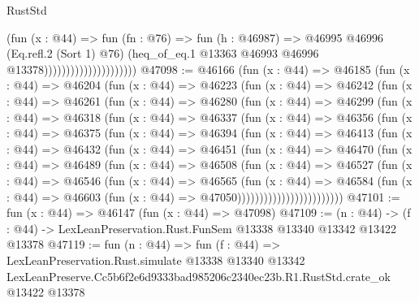 \begin{lexlean}{RustStd}
\begin{coremodule}
                                          (fun (x : @44) =>
                                          fun (fn : @76) =>
                                          fun (h : @46987) =>
                                          @46995
                                            @46996
                                            (Eq.refl.{2} (Sort 1) @76)
                                            (heq_of_eq.{1}
                                              @13363
                                              @46993
                                              @46996
                                              @13378)))))))))))))))))))))
@47098 := @46166
    (fun (x : @44) =>
    @46185
      (fun (x : @44) =>
      @46204
        (fun (x : @44) =>
        @46223
          (fun (x : @44) =>
          @46242
            (fun (x : @44) =>
            @46261
              (fun (x : @44) =>
              @46280
                (fun (x : @44) =>
                @46299
                  (fun (x : @44) =>
                  @46318
                    (fun (x : @44) =>
                    @46337
                      (fun (x : @44) =>
                      @46356
                        (fun (x : @44) =>
                        @46375
                          (fun (x : @44) =>
                          @46394
                            (fun (x : @44) =>
                            @46413
                              (fun (x : @44) =>
                              @46432
                                (fun (x : @44) =>
                                @46451
                                  (fun (x : @44) =>
                                  @46470
                                    (fun (x : @44) =>
                                    @46489
                                      (fun (x : @44) =>
                                      @46508
                                        (fun (x : @44) =>
                                        @46527
                                          (fun (x : @44) =>
                                          @46546
                                            (fun (x : @44) =>
                                            @46565
                                              (fun (x : @44) =>
                                              @46584
                                                (fun (x : @44) =>
                                                @46603
                                                  (fun (x : @44) => @47050))))))))))))))))))))))))
@47101 := fun (x : @44) => @46147 (fun (x : @44) => @47098)
@47109 := (n : @44) ->
  (f : @44) -> LexLeanPreservation.Rust.FunSem @13338 @13340 @13342 @13422 @13378
@47119 := fun (n : @44) =>
  fun (f : @44) =>
  LexLeanPreservation.Rust.simulate
    @13338
    @13340
    @13342
    LexLeanPreserve.Cc5b6f2e6d9333bad985206c2340ec23b.R1.RustStd.crate_ok
    @13422
    @13378
\end{coremodule}
\end{lexlean}
